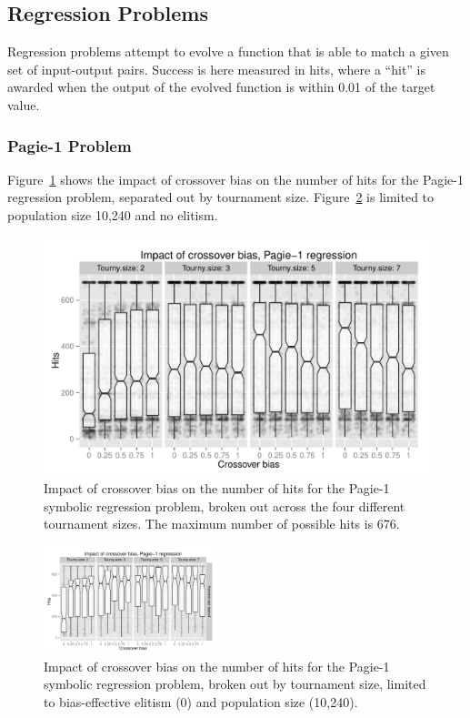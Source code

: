 \documentclass{sig-alternate}
\begin{document}
\subsection{Regression Problems}

Regression problems attempt to evolve a function that is able to match a given set of input-output pairs. 
Success is here measured in hits, where a ``hit'' is awarded when the output of the evolved function is within 0.01
of the target value.

\subsubsection{Pagie-1 Problem}

Figure~\ref{fig:Pagie1Hits_Bias_Tournys_FunctionSet} shows the impact of crossover bias on the number of hits for the
Pagie-1 regression problem, separated out by tournament size. 
Figure~\ref{fig:Pagie1StrongHits_Bias_Tournys_FunctionSet} is limited  to population size 10,240
and no elitism.

\begin{figure}[tb]
\centering
\includegraphics[width=0.45 \textwidth]{Plots/Pagie_1_Hits_vs_Bias_Tournys.pdf}
\caption{Impact of crossover bias on the number of hits for the Pagie-1 symbolic regression problem, 
	broken out across the four different tournament sizes. The maximum number of possible hits is 676.}
\label{fig:Pagie1Hits_Bias_Tournys_FunctionSet}
\end{figure}

\begin{figure}[tb]
\centering
\includegraphics[width=0.45\textwidth]
{Plots/Pagie_1_strong_No_Tarpeian_Hits_vs_Bias_Tournys_FunctionSet.pdf}
\caption{Impact of crossover bias on the number of hits for the Pagie-1 symbolic regression problem, 
	broken out by tournament size, limited to bias-effective elitism (0) and population size (10,240).}
\label{fig:Pagie1StrongHits_Bias_Tournys_FunctionSet}
\end{figure}
\end{document}
